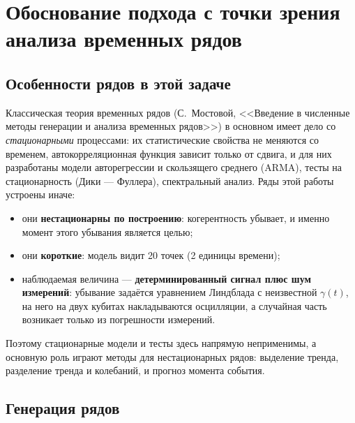 \documentclass[12pt,a4paper]{report}
\numberwithin{equation}{chapter}
\newif\ifshownotes\shownotesfalse
\newcommand{\note}[1]{\ifshownotes\par{\color{red}\small\textbf{[Пометка]} #1}\par\fi}
\begin{document}
\chapter{Обоснование подхода с точки зрения анализа временных рядов}
\label{chap:ts}

\section{Особенности рядов в этой задаче}

Классическая теория временных рядов (С.~Мостовой, <<Введение в численные
методы генерации и анализа временных рядов>>) в основном имеет дело со
\emph{стационарными} процессами: их статистические свойства не меняются
со временем, автокорреляционная функция зависит только от сдвига, и для
них разработаны модели авторегрессии и скользящего среднего (ARMA), тесты
на стационарность (Дики --- Фуллера), спектральный анализ. Ряды этой
работы устроены иначе:
\begin{itemize}
\item они \textbf{нестационарны по построению}: когерентность убывает, и
      именно момент этого убывания является целью;
\item они \textbf{короткие}: модель видит 20 точек (2 единицы времени);
\item наблюдаемая величина --- \textbf{детерминированный сигнал плюс шум
      измерений}: убывание задаётся уравнением Линдблада с неизвестной
      $\gamma(t)$, на него на двух кубитах накладываются осцилляции, а
      случайная часть возникает только из погрешности измерений.
\end{itemize}
Поэтому стационарные модели и тесты здесь напрямую неприменимы, а основную
роль играют методы для нестационарных рядов: выделение тренда, разделение
тренда и колебаний, и прогноз момента события.

\section{Генерация рядов}

\note{Генерация рядов (физический генератор, процессы AR(1) и
Орнштейна--Уленбека) корректна; замечание научного руководителя относится
не к ней, а к тому, что считается наблюдаемым рядом. Добавить сюда
различение: ряд ансамблевых средних (повторные приготовления) против ряда
исходов одного экземпляра (бинарная последовательность с обратным
влиянием измерения).}
\end{document}
